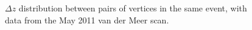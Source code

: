 \begin{figure}[h]
	\centering
	\caption{$\Delta z$ distribution between pairs of vertices in the same event, with data from the May 2011 van der Meer scan.}
	\label{fig:luminosity-deltaz}
\end{figure}


